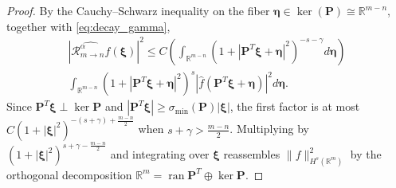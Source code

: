 \documentclass[11pt,a4paper]{article}
\theoremstyle{plain}
\theoremstyle{definition}
\theoremstyle{remark}
\numberwithin{equation}{section}
\begin{document}
\begin{proof}
By the Cauchy--Schwarz inequality on the fiber $\boldsymbol{\eta} \in \operatorname{ker}(\mathbf{P}) \cong \mathbb{R}^{m-n}$, together with \eqref{eq:decay_gamma},
\begin{multline*}
\left|\widehat{\mathcal{R}_{m \to n}^\alpha f}(\boldsymbol{\xi})\right|^2 \le C \left(\int_{\mathbb{R}^{m-n}} (1 + |\mathbf{P}^T\boldsymbol{\xi} + \boldsymbol{\eta}|^2)^{-s - \gamma} d\boldsymbol{\eta}\right) \\
\int_{\mathbb{R}^{m-n}} (1 + |\mathbf{P}^T\boldsymbol{\xi} + \boldsymbol{\eta}|^2)^s |\widehat{f}(\mathbf{P}^T\boldsymbol{\xi} + \boldsymbol{\eta})|^2 d\boldsymbol{\eta}.
\end{multline*}
Since $\mathbf{P}^T\boldsymbol{\xi} \perp \ker\mathbf{P}$ and $|\mathbf{P}^T\boldsymbol{\xi}| \ge \sigma_{\min}(\mathbf{P})|\boldsymbol{\xi}|$, the first factor is at most $C(1 + |\boldsymbol{\xi}|^2)^{-(s+\gamma) + \frac{m-n}{2}}$ when $s + \gamma > \frac{m-n}{2}$. Multiplying by $(1+|\boldsymbol{\xi}|^2)^{s + \gamma - \frac{m-n}{2}}$ and integrating over $\boldsymbol{\xi}$ reassembles $\|f\|_{H^s(\mathbb{R}^m)}^2$ by the orthogonal decomposition $\mathbb{R}^m = \operatorname{ran}\mathbf{P}^T \oplus \ker\mathbf{P}$.
\end{proof}
\end{document}
